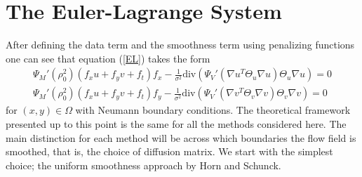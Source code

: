 \section{The Euler-Lagrange System}
After defining the data term and the smoothness term using penalizing functions one can see that equation (\ref{EL}) takes the form
\begin{equation}
\label{EL_regu}
\begin{aligned}
\Psi_M'(\rho_0^2)(f_xu+f_yv + f_t)f_x - \frac{1}{\sigma^2} \text{div} \left(\Psi_V'(\nabla u^T \Theta_u \nabla u)  \Theta_u \nabla u \right) = 0 \\
\Psi_M'(\rho_0^2)(f_xu+f_yv + f_t)f_y - \frac{1}{\sigma^2} \text{div} \left(\Psi_V'(\nabla v^T \Theta_v \nabla v)  \Theta_v \nabla v \right) = 0
\end{aligned}
\end{equation}
for $(x,y) \in \Omega$ with Neumann boundary conditions. The theoretical framework presented up to this point is the same for all the methods considered here. The main distinction for each method will be across which boundaries the flow field is smoothed, that is, the choice of diffusion matrix. We start with the simplest choice; the uniform smoothness approach by Horn and Schunck.

